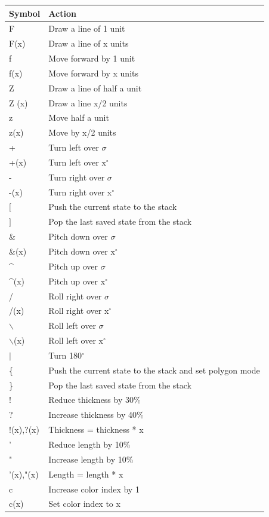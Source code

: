 \documentclass[11pt,a4paper]{article}
\newcommand{\degree}{\ensuremath{^\circ}}
\begin{document}
\begin{center}
\begin{longtable}{l | l}
Symbol & Action \\ \hline
F & Draw a line of 1 unit \\
F(x) & Draw a line of x units \\
f & Move forward by 1 unit \\
f(x) & Move forward by x units \\
Z & Draw a line of half a unit \\
Z (x) & Draw a line x/2 units \\
z & Move half a unit \\
z(x) & Move by x/2 units \\
+ & Turn left over $\sigma$ \\
+(x) & Turn left over x\degree \\
- & Turn right over $\sigma$ \\
-(x) & Turn right over x\degree \\
$[$ & Push the current state to the stack \\
$]$ & Pop the last saved state from the stack \\
\& & Pitch down over $\sigma$ \\
\&(x) & Pitch down over x\degree \\
\^{} & Pitch up over $\sigma$ \\
\^{}(x) & Pitch up over x\degree \\
/ & Roll right over $\sigma$ \\
/(x) & Roll right over x\degree \\
$\backslash$ & Roll left over $\sigma$ \\
$\backslash$(x) & Roll left over x\degree \\
$\vert$  & Turn 180\degree \\
\{ & Push the current state to the stack and set polygon mode \\
\} & Pop the last saved state from the stack \\
! & Reduce thickness by 30\% \\
? & Increase thickness by 40\% \\
!(x),?(x) & Thickness = thickness * x \\
' & Reduce length by 10\% \\
" & Increase length by 10\% \\
'(x),"(x) & Length = length * x \\
c & Increase color index by 1 \\
c(x) & Set color index to x \\
\end{longtable}
\end{center}
\end{document}
